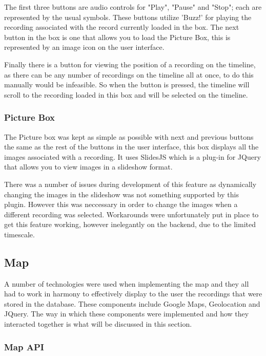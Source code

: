 \documentclass{l3proj}
\begin{document}
The first three buttons are audio controls for "Play", "Pause" and "Stop"; each are represented by the usual symbols. These buttons utilize 'Buzz!' for playing the recording associated with the record currently loaded in the box. The next button in the box is one that allows you to load the Picture Box, this is represented by an image icon on the user interface.

Finally there is a button for viewing the position of a recording on the timeline, as there can be any number of recordings on the timeline all at once, to do this manually would be infeasible. So when the button is pressed, the timeline will scroll to the recording loaded in this box and will be selected on the timeline.

\subsubsection{Picture Box}

The Picture box was kept as simple as possible with next and previous buttons the same as the rest of the buttons in the user interface, this box displays all the images associated with a recording. It uses SlidesJS which is a plug-in for JQuery that allows you to view images in a slideshow format.

There was a number of issues during development of this feature as dynamically changing the images in the slideshow was not something supported by this plugin. However this was neccessary in order to change the images when a different recording was selected. Workarounds were unfortunately put in place to get this feature working, however inelegantly on the backend, due to the limited timescale.

\subsection{Map}

A number of technologies were used when implementing the map and they all had to work in harmony to effectively display to the user the recordings that were stored in the database. These components include Google Maps, Geolocation and JQuery. The way in which these components were implemented and how they interacted together is what will be discussed in this section.

\subsubsection{Map API}
\end{document}
